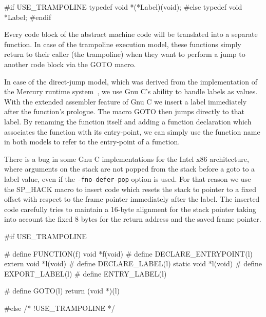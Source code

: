 #if USE_TRAMPOLINE
typedef void *(*Label)(void);
#else
typedef void *Label;
#endif

\nwendcode{}\nwdocspar
Every code block of the abstract machine code will be translated into
a separate function. In case of the trampoline execution model, these
functions simply return to their caller (the trampoline) when they
want to perform a jump to another code block via the {\Tt{}GOTO\nwendquote} macro.

In case of the direct-jump model, which was derived from the
implementation of the Mercury runtime
system~\cite{HendersonConwaySomogyi95:Portable}, we use Gnu C's
ability to handle labels as values. With the extended assembler
feature of Gnu C we insert a label immediately after the function's
prologue. The macro {\Tt{}GOTO\nwendquote} then jumps directly to that label. By
renaming the function itself and adding a function declaration which
associates the function with its entry-point, we can simply use the
function name in both models to refer to the entry-point of a function.

There is a bug in some Gnu C implementations for the Intel x86
architecture, where arguments on the stack are not popped from the
stack before a {\Tt{}goto\nwendquote} to a label value, even if the
\texttt{-fno-defer-pop} option is used. For that reason we use the
{\Tt{}SP{\_}HACK\nwendquote} macro to insert code which resets the stack to pointer to
a fixed offset with respect to the frame pointer immediately after the
label. The inserted code carefully tries to maintain a 16-byte
alignment for the stack pointer taking into account the fixed 8 bytes
for the return address and the saved frame pointer.

\nwenddocs{}\plusendmoddef\nwstartdeflinemarkup{}\nwenddeflinemarkup
#if USE_TRAMPOLINE

# define FUNCTION(f)            void *f(void)
# define DECLARE_ENTRYPOINT(l)  extern void *l(void)
# define DECLARE_LABEL(l)       static void *l(void)
# define EXPORT_LABEL(l)
# define ENTRY_LABEL(l)

# define GOTO(l)                return (void *)(l)

#else /* !USE_TRAMPOLINE */


